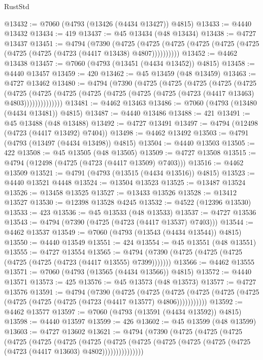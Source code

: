 \begin{lexlean}{RustStd}
\begin{coremodule}
{\begin{coremodule}
{{{{{{{{{{{{{{{{{{{{{{{{{{{{{{{{{{{{{{{{{{{{{{{{{{{{{{{{{{{{@13432 := @7060 (@4793 (@13426 (@4434 @13427)) @4815)
@13433 := @4440 @13432
@13434 := 419
@13437 := @45 @13434 (@48 @13434)
@13438 := @4727 @13437
@13451 := @4794
    (@7390
      (@4725 (@4725 (@4725 (@4725 (@4725 (@4725 (@4725 (@4725 (@4723 (@4417 @13438) @4807))))))))))
@13452 := @4462 @13438
@13457 := @7060 (@4793 (@13451 (@4434 @13452)) @4815)
@13458 := @4440 @13457
@13459 := 420
@13462 := @45 @13459 (@48 @13459)
@13463 := @4727 @13462
@13480 := @4794
    (@7390
      (@4725
        (@4725
          (@4725
            (@4725
              (@4725
                (@4725
                  (@4725
                    (@4725 (@4725 (@4725 (@4725 (@4725 (@4723 (@4417 @13463) @4803))))))))))))))
@13481 := @4462 @13463
@13486 := @7060 (@4793 (@13480 (@4434 @13481)) @4815)
@13487 := @4440 @13486
@13488 := 421
@13491 := @45 @13488 (@48 @13488)
@13492 := @4727 @13491
@13497 := @4794 (@12498 (@4723 (@4417 @13492) @7404))
@13498 := @4462 @13492
@13503 := @4791 (@4793 (@13497 (@4434 @13498)) @4815)
@13504 := @4440 @13503
@13505 := 422
@13508 := @45 @13505 (@48 @13505)
@13509 := @4727 @13508
@13515 := @4794 (@12498 (@4725 (@4723 (@4417 @13509) @7403)))
@13516 := @4462 @13509
@13521 := @4791 (@4793 (@13515 (@4434 @13516)) @4815)
@13523 := @4440 @13521 @4448
@13524 := @13504 @13523
@13525 := @13487 @13524
@13526 := @13458 @13525
@13527 := @13433 @13526
@13528 := @13412 @13527
@13530 := @12398 @13528 @4245
@13532 := @4522 (@12396 @13530)
@13533 := 423
@13536 := @45 @13533 (@48 @13533)
@13537 := @4727 @13536
@13543 := @4794 (@7390 (@4725 (@4723 (@4417 @13537) @7403)))
@13544 := @4462 @13537
@13549 := @7060 (@4793 (@13543 (@4434 @13544)) @4815)
@13550 := @4440 @13549
@13551 := 424
@13554 := @45 @13551 (@48 @13551)
@13555 := @4727 @13554
@13565 := @4794 (@7390 (@4725 (@4725 (@4725 (@4725 (@4725 (@4723 (@4417 @13555) @7399)))))))
@13566 := @4462 @13555
@13571 := @7060 (@4793 (@13565 (@4434 @13566)) @4815)
@13572 := @4440 @13571
@13573 := 425
@13576 := @45 @13573 (@48 @13573)
@13577 := @4727 @13576
@13591 := @4794
    (@7390
      (@4725
        (@4725
          (@4725 (@4725 (@4725 (@4725 (@4725 (@4725 (@4725 (@4723 (@4417 @13577) @4806)))))))))))
@13592 := @4462 @13577
@13597 := @7060 (@4793 (@13591 (@4434 @13592)) @4815)
@13598 := @4440 @13597
@13599 := 426
@13602 := @45 @13599 (@48 @13599)
@13603 := @4727 @13602
@13621 := @4794
    (@7390
      (@4725
        (@4725
          (@4725
            (@4725
              (@4725
                (@4725
                  (@4725
                    (@4725
                      (@4725 (@4725 (@4725 (@4725 (@4725 (@4723 (@4417 @13603) @4802)))))))))))))))
}}}}}}}}}}}}}}}}}}}}}}}}}}}}}}}}}}}}}}}}}}}}}}}}}}}}}}}}}}}}
\end{coremodule}}
\end{coremodule}
\end{lexlean}
